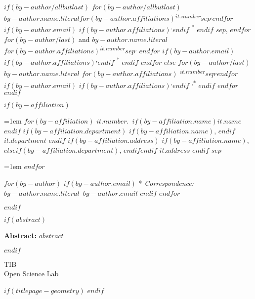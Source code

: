 \begin{tcolorbox}

$if(by-author/allbutlast)$
  \noindent\ignorespaces%
  $for(by-author/allbutlast)$
    {\large{$by-author.name.literal$}}$for(by-author.affiliations)${\textsuperscript{$it.number$}}$sep$\textsuperscript{,}$endfor$%
  $if(by-author.email)$%
  $if(by-author.affiliations)$\textsuperscript{,}$endif$%
  {\textsuperscript{*}}%
  $endif$%
  $sep$, 
  $endfor$
  $for(by-author/last)$%
    { and \large{$by-author.name.literal$}}%
  $for(by-author.affiliations)${\textsuperscript{$it.number$}}$sep$\textsuperscript{,}%
  $endfor$%
  $if(by-author.email)$%
    $if(by-author.affiliations)$\textsuperscript{,}$endif$%
    {\textsuperscript{*}}%
  $endif$%
  $endfor$
  $else$
  \noindent\ignorespaces%
  $for(by-author/last)$%
    {\large{$by-author.name.literal$}}%
    $for(by-author.affiliations)$%
    {\textsuperscript{$it.number$}}$sep$\textsuperscript{,}$endfor$%
  $if(by-author.email)$%
    $if(by-author.affiliations)$\textsuperscript{,}$endif$%
    {\textsuperscript{,*}}%
$endif$%
$endfor$
$endif$

$if(by-affiliation)$
\vspace{2\baselineskip} 

\hangindent=1em
$for(by-affiliation)$%
{$it.number$}.~$if(by-affiliation.name)${$it.name$}$endif$%
$if(by-affiliation.department)$%
$if(by-affiliation.name)$, $endif$%
{$it.department$}%
$endif$%
$if(by-affiliation.address)$%
$if(by-affiliation.name)$, $else$$if(by-affiliation.department)$, $endif$$endif$%
{$it.address$}%
$endif$%
$sep$\par\hangindent=1em%
$endfor$

\vspace{1\baselineskip} 

$for(by-author)$
$if(by-author.email)$
* \textit{Correspondence:}~$by-author.name.literal$~$by-author.email$\newline
$endif$
$endfor$

$endif$
\end{tcolorbox}

$if(abstract)$
\begin{tcolorbox}

  \textbf{Abstract:\newline}
  $abstract$

\end{tcolorbox}
$endif$


\vfill

\vspace{1\baselineskip} 

\begin{tcolorbox}
\centering

{
  TIB\\
  Open Science Lab
}
\end{tcolorbox}

$if(titlepage-geometry)$
  \restoregeometry
$endif$

